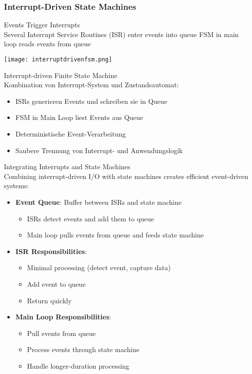 \subsubsection{Interrupt-Driven State Machines}

\begin{definition}{Events Trigger Interrupts}\\
    Several Interrupt Service Routines (ISR) enter events into queue
    FSM in main loop reads events from queue

    \texttt{[image: interruptdrivenfsm.png]}
\end{definition}

\begin{concept}{Interrupt-driven Finite State Machine}\\
    Kombination von Interrupt-System und Zustandsautomat:
    \begin{itemize}
        \item ISRs generieren Events und schreiben sie in Queue
        \item FSM in Main Loop liest Events aus Queue
        \item Deterministische Event-Verarbeitung
        \item Saubere Trennung von Interrupt- und Anwendungslogik
    \end{itemize}
\end{concept}

\begin{theorem}{Integrating Interrupts and State Machines}\\
Combining interrupt-driven I/O with state machines creates efficient event-driven systems:
\begin{itemize}
    \item \textbf{Event Queue}: Buffer between ISRs and state machine
    \begin{itemize}
        \item ISRs detect events and add them to queue
        \item Main loop pulls events from queue and feeds state machine
    \end{itemize}
    \item \textbf{ISR Responsibilities}:
    \begin{itemize}
        \item Minimal processing (detect event, capture data)
        \item Add event to queue
        \item Return quickly
    \end{itemize}
    \item \textbf{Main Loop Responsibilities}:
    \begin{itemize}
        \item Pull events from queue
        \item Process events through state machine
        \item Handle longer-duration processing
    \end{itemize}
\end{itemize}
\end{theorem}


